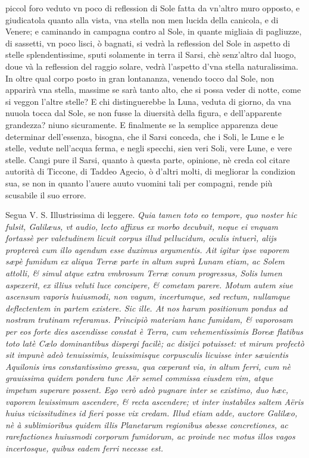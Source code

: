 \documentclass[11pt,twoside,openany]{book}
\begin{document}
piccol foro veduto vn poco di reflession di Sole fatta da vn'altro muro opposto, e giudicatola quanto alla vista, vna stella non men lucida della canicola, e di Venere; e caminando in campagna contro al Sole, in quante migliaia di pagliuzze, di sassetti, vn poco lisci, ò bagnati, si vedrà la reflession del Sole in aspetto di stelle splendentissime, sputi solamente in terra il Sarsi, chè senz'altro dal luogo, doue và la reflession del raggio solare, vedrà l'aspetto d'vna stella naturalissima. In oltre qual corpo posto in gran lontananza, venendo tocco dal Sole, non apparirà vna stella, massime se sarà tanto alto, che si possa veder di notte, come si veggon l'altre stelle? E chi distinguerebbe la Luna, veduta di giorno, da vna nuuola tocca dal Sole, se non fusse la diuersità della figura, e dell'apparente grandezza? niuno sicuramente. E finalmente se la semplice apparenza deue determinar dell'essenza, bisogna, che il Sarsi conceda, che i Soli, le Lune e le stelle, vedute nell'acqua ferma, e negli specchi, sien veri Soli, vere Lune, e vere stelle. Cangi pure il Sarsi, quanto à questa parte, opinione, nè creda col citare autorità di Ticcone, di Taddeo Agecio, ò d'altri molti, di megliorar la condizion sua, se non in quanto l'auere auuto vuomini tali per compagni, rende più scusabile il suo errore.



\par\bigskip\noindent{}\enspace Segua V. S. Illustrissima di leggere. \textit{Quia tamen toto eo tempore, quo noster hic fulsit, Galilæus, vt audio, lecto affixus ex morbo decubuit, neque ei vnquam fortassè per valetudinem licuit corpus illud pellucidum, oculis intuerì, alijs proptereà cum illo agendum esse duximus argumentis. Ait igitur ipse vaporem sæpè fumidum ex aliqua Terræ parte in altum suprà Lunam etiam, ac Solem attolli, \& simul atque extra vmbrosum Terræ conum progressus, Solis lumen aspexerit, ex illius veluti luce concipere, \& cometam parere. Motum autem siue ascensum vaporis huiusmodi, non vagum, incertumque, sed rectum, nullamque deflectentem in partem existere. Sic ille. At nos harum positionum pondus ad nostram trutinam referamus. Principiò materiam hanc fumidam, \& vaporosam per eos forte dies ascendisse constat è Terra, cum vehementissimis Boreæ flatibus toto latè Cælo dominantibus dispergi facilè; ac disijci potuisset: vt mirum profectò sit impunè adeò tenuissimis, leuissimisque corpusculis licuisse inter sæuientis Aquilonis iras constantissimo gressu, qua cœperant via, in altum ferri, cum nè grauissima quidem pondera tunc Aër semel commissa eiusdem vim, atque impetum superare possent. Ego verò adeò pugnare inter se existimo, duo hæc, vaporem leuissimum ascendere, \& recta ascendere; vt inter instabiles saltem Aëris huius vicissitudines id fieri posse vix credam. Illud etiam adde, auctore Galilæo, nè à sublimioribus quidem illis Planetarum regionibus abesse concretiones, ac rarefactiones huiusmodi corporum fumidorum, ac proinde nec motus illos vagos incertosque, quibus eadem ferri necesse est.}
\end{document}
